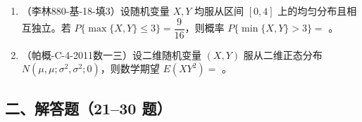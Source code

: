 \documentclass[12pt,a4paper]{ctexart}
\begin{document}
\begin{enumerate}[label=\arabic*.]
\item（李林880-基-18-填3）设随机变量 $X, Y$ 均服从区间 $[0, 4]$ 上的均匀分布且相互独立。若 $P\{\max\{X, Y\} \leqslant 3\} = \dfrac{9}{16}$，则概率 $P\{\min\{X, Y\} > 3\} = $ \underline{\hspace{5em}}。

\item（帕概-C-4-2011数一三）设二维随机变量 $(X, Y)$ 服从二维正态分布 $N(\mu, \mu; \sigma^{2}, \sigma^{2}; 0)$，则数学期望 $E(XY^{2}) = $ \underline{\hspace{5em}}。

\end{enumerate}

\subsection*{二、解答题（21--30 题）}

\end{document}
